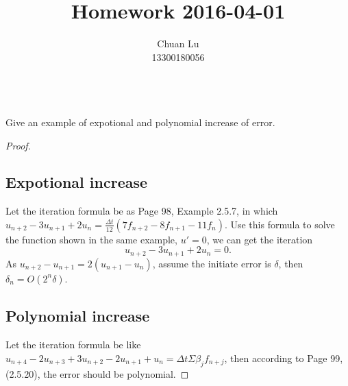 \documentclass{article}
\newenvironment{problem}[2][Problem]{\begin{trivlist}
\item[\hskip \labelsep {\bfseries #1}\hskip \labelsep {\bfseries #2.}]}{\end{trivlist}}
\begin{document}
\title{Homework 2016-04-01}
\author{Chuan Lu\\
13300180056}

\maketitle

\begin{problem}{1}
\text{ }\\
Give an example of expotional and polynomial increase of error.
\end{problem}

\begin{proof}
\subsection{Expotional increase} 
Let the iteration formula be as Page 98, Example 2.5.7, in which $u_{n+2} - 3u_{n+1} + 2u_{n} = \frac{\Delta t}{12}(7f_{n+2} - 8f_{n+1} - 11f_{n})$. Use this formula to solve the function shown in the same example, $u'=0$, we can get the iteration $$u_{n+2} - 3u_{n+1} + 2u_{n} = 0.$$
As $u_{n+2} - u_{n+1} = 2(u_{n+1} - u_{n})$, assume the initiate error is $\delta$, then $\delta_{n} = O(2^{n}\delta)$.
\subsection{Polynomial increase}
Let the iteration formula be like $u_{n+4}-2u_{n+3}+3u_{n+2}-2u_{n+1}+u_{n} = \Delta t\Sigma\beta_{j}f_{n+j}$, then according to Page 99, (2.5.20), the error should be polynomial.
\end{proof}

\end{document}
